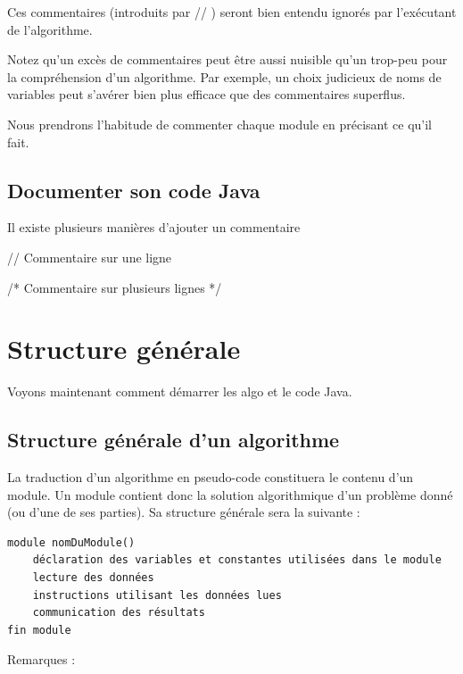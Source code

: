 \documentclass[11pt,a4paper]{article}
\begin{document}
            \par
        
        Ces commentaires (introduits par \guillemotleft  // \guillemotright ) seront bien entendu ignor\'es par l'ex\'ecutant de l'algorithme.
      
            \par
        
        Notez qu'un exc\`es de commentaires peut \^etre aussi nuisible qu'un trop-peu pour la 
        compr\'ehension d'un algorithme. 
        Par exemple, un choix judicieux de noms de variables peut s'av\'erer bien plus efficace que des commentaires superflus.
      
            \par
        
        Nous prendrons l'habitude de commenter chaque module en pr\'ecisant ce qu'il fait.
      
            \par
        \subsection{Documenter son code Java}Il existe plusieurs mani\`eres d'ajouter un commentaire
            \par
        \begin{Java}
// Commentaire sur une ligne
\end{Java}\begin{Java}
  /* Commentaire sur
  plusieurs lignes */
\end{Java}\section{Structure g\'en\'erale}
				Voyons maintenant comment d\'emarrer les algo et le code Java.
      
            \par
        \subsection{Structure g\'en\'erale d'un algorithme}
          La traduction d'un algorithme en pseudo-code constituera le contenu d'un module. 
          Un module contient donc la solution algorithmique d'un probl\`eme donn\'e (ou d'une de ses parties).
          Sa structure g\'en\'erale sera la suivante :
        
            \par
        \begin{verbatim}
module nomDuModule()
    déclaration des variables et constantes utilisées dans le module
    lecture des données
    instructions utilisant les données lues
    communication des résultats
fin module
				\end{verbatim}
          Remarques :
          
\end{document}
